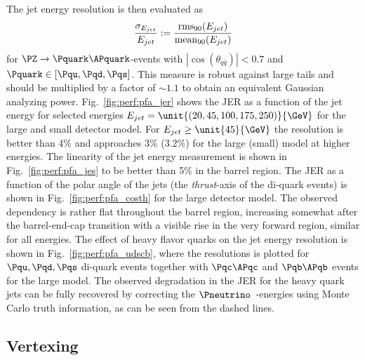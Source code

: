 %
%
The jet energy resolution is then evaluated as 
\begin{equation}\label{ild:eq:jer}
\frac{ \sigma_{E_{jet}} } { E_{jet}}  :=  \frac{\mathrm{rms}_{90}(E_{jet})}{ \mathrm{mean}_{90}(E_{jet})}
\end{equation}
for $\PZ\rightarrow \Pquark\APquark$-events with $|\cos(\theta_{q\bar q})|<0.7$ and $\Pquark \in [\Pqu,\Pqd,\Pqs]$. This measure is robust against large tails and
should be multiplied by a factor of $\sim1.1$ to obtain an equivalent Gaussian analyzing power\cite{ild:bib:PandoraPFA}.
Fig.~\ref{fig:perf:pfa_jer} shows the JER as a function of the jet energy for selected energies $E_{jet}=\unit{(20, 45, 100, 175, 250)}{\GeV}$
for the large and small detector model. For $E_{jet}\geq \unit{45}{\GeV}$ the resolution is better than 4\% and approaches 3\% (3.2\%) for the large (small) model
at higher energies. The linearity of the jet energy measurement is shown in Fig.~\ref{fig:perf:pfa_jes} to be better than 5\% in the barrel region.
The JER as a function of the polar angle of the jets (the {\em thrust}-axis of the di-quark events) is shown in Fig.~\ref{fig:perf:pfa_costh} for the
large detector model. The observed dependency is rather flat throughout the barrel region, increasing somewhat after the barrel-end-cap transition
with a visible rise in the very forward region, similar for all energies. The effect of heavy flavor quarks on the jet energy resolution is shown in
Fig.~\ref{fig:perf:pfa_udscb}, where the resolutions is plotted for $\Pqu,\Pqd,\Pqs$ di-quark events together with $\Pqc\APqc$ and $\Pqb\APqb$ events for the large model.
The observed degradation in the JER for the heavy quark jets can be fully recovered by correcting the $\Pneutrino$~-energies using Monte Carlo truth information, as
can be seen from the dashed lines.



\subsection{Vertexing}

